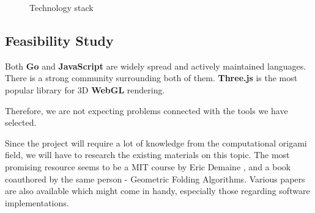 \begin{figure}[H]
	\caption{Technology stack}
	\centering
\end{figure}


\subsection{Feasibility Study}

Both \textbf{Go} and \textbf{JavaScript} are widely spread and actively maintained languages.
There is a strong community surrounding both of them.
\textbf{Three.js} is the most popular library for 3D \textbf{WebGL} rendering.

Therefore, we are not expecting problems connected with the tools we have selected.

Since the project will require a lot of knowledge from the computational origami
field, we will have to research the existing materials on this topic.
The most promising resource seems to be a MIT course by
Eric Demaine \cite{mit-course}, and a book coauthored by the same person -
Geometric Folding Algorithms\cite{origami-book}.
Various papers are also available which might come in handy, especially those regarding software implementations.


